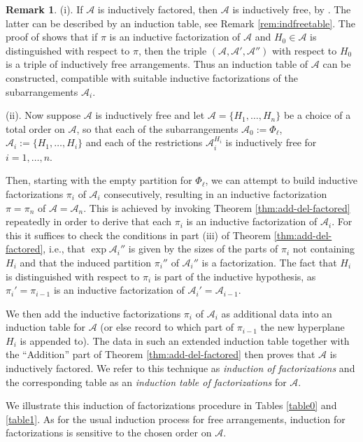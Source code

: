 \documentclass[12pt]{amsart}
\newcommand\CA{{\mathscr A}}
\numberwithin{equation}{section}
\theoremstyle{plain}
\theoremstyle{definition}
\newtheorem{remark}[equation]{Remark}
\begin{document}
\begin{remark}
	\label{rem:indtable}
	(i).
	If $\CA$ is inductively factored, then  $\CA$ is inductively free,
	by \cite[Prop.~3.14]{hogeroehrle:factored}.
	The latter can be described by an induction table, see Remark \ref{rem:indfreetable}.
	The proof of \cite[Prop.~3.14]{hogeroehrle:factored} shows
	that if $\pi$ is an inductive factorization of $\CA$
	and $H_0 \in \CA$ is distinguished with respect to $\pi$, then
	the triple $(\CA, \CA', \CA'')$ with respect to $H_0$
	is a triple of inductively free arrangements.
	Thus an induction table of $\CA$ can be constructed,
	compatible with suitable inductive factorizations of
	the subarrangements $\CA_i$.

	(ii).
	Now suppose $\CA$ is inductively free and let
	$\CA = \{H_1, \ldots, H_n\}$ be a
	choice of a total order on $\CA$,
	so that each of the subarrangements
	$\CA_0 := \Phi_\ell$, $\CA_i := \{H_1, \ldots, H_i\}$
	and each of the restrictions $\CA_i^{H_i}$ is inductively free
	for $i = 1, \ldots, n$.

	Then, starting with the empty partition for $\Phi_\ell$, we can attempt to
	build inductive factorizations $\pi_i$ of $\CA_i$
	consecutively, resulting in an inductive factorization
	$\pi = \pi_n$ of $\CA = \CA_n$.
	This is achieved by invoking Theorem \ref{thm:add-del-factored}
	repeatedly in order to derive that each $\pi_i$ is an inductive factorization of $\CA_i$.
	For this it suffices to check
	the conditions in part (iii) of Theorem \ref{thm:add-del-factored}, i.e.,  that
	$\exp \CA_i''$ is given by the sizes of the parts of $\pi_i$ not containing $H_i$
	and that the induced partition $\pi_i''$ of $\CA_i''$ is a factorization.
	The fact that $H_i$ is distinguished
	with respect to $\pi_i$ is part of the inductive hypothesis, as
	$\pi_i' = \pi_{i-1}$ is an inductive factorization of $\CA_i' = \CA_{i-1}$.

	We then add the inductive factorizations $\pi_i$
	of $\CA_i$ as additional data into an induction table for $\CA$
	(or else record to which part of $\pi_{i-1}$ the new hyperplane $H_i$ is appended to).
	The data in such an extended induction table
	together with the ``Addition'' part of Theorem \ref{thm:add-del-factored}
	then proves that $\CA$ is
	inductively factored.
	We refer to this technique as \emph{induction of factorizations} and the
	corresponding table as an \emph{induction table of factorizations} for $\CA$.

	We illustrate this induction of factorizations procedure in Tables \ref{table0} and \ref{table1}.
	As for the usual induction process for free arrangements,
	induction for factorizations is sensitive to the chosen order on $\CA$.
\end{remark}
\end{document}
